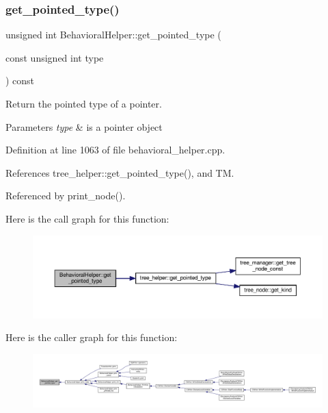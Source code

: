 \subsubsection{\texorpdfstring{get\+\_\+pointed\+\_\+type()}{get\_pointed\_type()}}
{\footnotesize\ttfamily unsigned int Behavioral\+Helper\+::get\+\_\+pointed\+\_\+type (\begin{DoxyParamCaption}\item[{const unsigned int}]{type }\end{DoxyParamCaption}) const\hspace{0.3cm}{\ttfamily [virtual]}}



Return the pointed type of a pointer. 


\begin{DoxyParams}{Parameters}
{\em type} & is a pointer object \\
\hline
\end{DoxyParams}


Definition at line 1063 of file behavioral\+\_\+helper.\+cpp.



References tree\+\_\+helper\+::get\+\_\+pointed\+\_\+type(), and TM.



Referenced by print\+\_\+node().

Here is the call graph for this function\+:
\nopagebreak
\begin{figure}[H]
\begin{center}
\leavevmode
\includegraphics[width=350pt]{dd/db2/classBehavioralHelper_a19d53544a2afa3c307cb84725748d54c_cgraph}
\end{center}
\end{figure}
Here is the caller graph for this function\+:
\nopagebreak
\begin{figure}[H]
\begin{center}
\leavevmode
\includegraphics[width=350pt]{dd/db2/classBehavioralHelper_a19d53544a2afa3c307cb84725748d54c_icgraph}
\end{center}
\end{figure}
\mbox{\label{classBehavioralHelper_a646378cb2887db81dfd9a648cf911f56}} 
